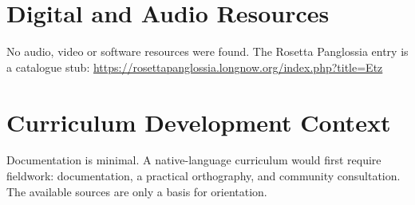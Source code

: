 \documentclass[12pt]{article}
\begin{document}
\section{Digital and Audio Resources}
No audio, video or software resources were found. The Rosetta Panglossia entry is a catalogue stub: \url{https://rosettapanglossia.longnow.org/index.php?title=Etz}

\section{Curriculum Development Context}
Documentation is minimal. A native-language curriculum would first require fieldwork: documentation, a practical orthography, and community consultation. The available sources are only a basis for orientation.
\end{document}
